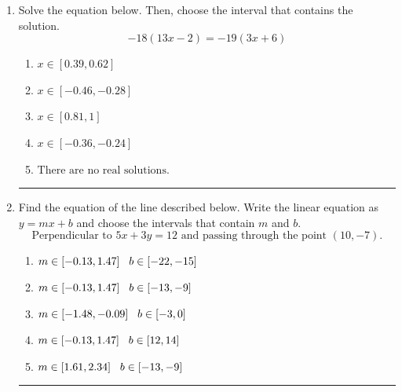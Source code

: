 \documentclass[14pt]{extbook}
\newcommand{\litem}[1]{\item#1\hspace*{-1cm}\rule{\textwidth}{0.4pt}}
\begin{document}
\begin{enumerate}
{\begin{enumerate}[label=\Alph*.]
\end{enumerate} }
\litem{
Solve the equation below. Then, choose the interval that contains the solution.\[ -18(13x -2) = -19(3x + 6) \]\begin{enumerate}[label=\Alph*.]
\item \( x \in [0.39, 0.62] \)
\item \( x \in [-0.46, -0.28] \)
\item \( x \in [0.81, 1] \)
\item \( x \in [-0.36, -0.24] \)
\item \( \text{There are no real solutions.} \)

\end{enumerate} }
\litem{
Find the equation of the line described below. Write the linear equation as $ y=mx+b $ and choose the intervals that contain $m$ and $b$.\[ \text{Perpendicular to } 5 x + 3 y = 12 \text{ and passing through the point } (10, -7). \]\begin{enumerate}[label=\Alph*.]
\item \( m \in [-0.13, 1.47] \hspace*{3mm} b \in [-22, -15] \)
\item \( m \in [-0.13, 1.47] \hspace*{3mm} b \in [-13, -9] \)
\item \( m \in [-1.48, -0.09] \hspace*{3mm} b \in [-3, 0] \)
\item \( m \in [-0.13, 1.47] \hspace*{3mm} b \in [12, 14] \)
\item \( m \in [1.61, 2.34] \hspace*{3mm} b \in [-13, -9] \)


\end{enumerate}}
\end{enumerate}
\end{document}
